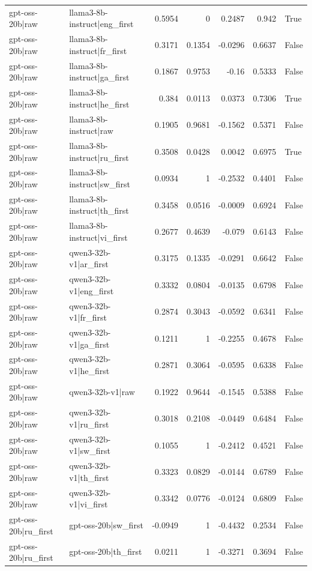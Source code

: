 \begin{table}
\begin{tabular}{l l r r r r l}
gpt-oss-20b|raw & llama3-8b-instruct|eng_first & 0.5954 & 0 & 0.2487 & 0.942 & True \\
gpt-oss-20b|raw & llama3-8b-instruct|fr_first & 0.3171 & 0.1354 & -0.0296 & 0.6637 & False \\
gpt-oss-20b|raw & llama3-8b-instruct|ga_first & 0.1867 & 0.9753 & -0.16 & 0.5333 & False \\
gpt-oss-20b|raw & llama3-8b-instruct|he_first & 0.384 & 0.0113 & 0.0373 & 0.7306 & True \\
gpt-oss-20b|raw & llama3-8b-instruct|raw & 0.1905 & 0.9681 & -0.1562 & 0.5371 & False \\
gpt-oss-20b|raw & llama3-8b-instruct|ru_first & 0.3508 & 0.0428 & 0.0042 & 0.6975 & True \\
gpt-oss-20b|raw & llama3-8b-instruct|sw_first & 0.0934 & 1 & -0.2532 & 0.4401 & False \\
gpt-oss-20b|raw & llama3-8b-instruct|th_first & 0.3458 & 0.0516 & -0.0009 & 0.6924 & False \\
gpt-oss-20b|raw & llama3-8b-instruct|vi_first & 0.2677 & 0.4639 & -0.079 & 0.6143 & False \\
gpt-oss-20b|raw & qwen3-32b-v1|ar_first & 0.3175 & 0.1335 & -0.0291 & 0.6642 & False \\
gpt-oss-20b|raw & qwen3-32b-v1|eng_first & 0.3332 & 0.0804 & -0.0135 & 0.6798 & False \\
gpt-oss-20b|raw & qwen3-32b-v1|fr_first & 0.2874 & 0.3043 & -0.0592 & 0.6341 & False \\
gpt-oss-20b|raw & qwen3-32b-v1|ga_first & 0.1211 & 1 & -0.2255 & 0.4678 & False \\
gpt-oss-20b|raw & qwen3-32b-v1|he_first & 0.2871 & 0.3064 & -0.0595 & 0.6338 & False \\
gpt-oss-20b|raw & qwen3-32b-v1|raw & 0.1922 & 0.9644 & -0.1545 & 0.5388 & False \\
gpt-oss-20b|raw & qwen3-32b-v1|ru_first & 0.3018 & 0.2108 & -0.0449 & 0.6484 & False \\
gpt-oss-20b|raw & qwen3-32b-v1|sw_first & 0.1055 & 1 & -0.2412 & 0.4521 & False \\
gpt-oss-20b|raw & qwen3-32b-v1|th_first & 0.3323 & 0.0829 & -0.0144 & 0.6789 & False \\
gpt-oss-20b|raw & qwen3-32b-v1|vi_first & 0.3342 & 0.0776 & -0.0124 & 0.6809 & False \\
gpt-oss-20b|ru_first & gpt-oss-20b|sw_first & -0.0949 & 1 & -0.4432 & 0.2534 & False \\
gpt-oss-20b|ru_first & gpt-oss-20b|th_first & 0.0211 & 1 & -0.3271 & 0.3694 & False \\

\end{tabular}
\end{table}
